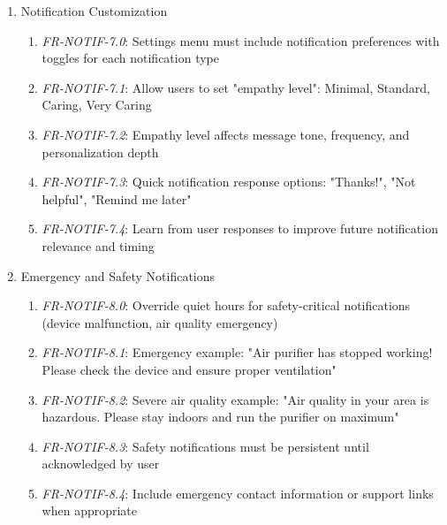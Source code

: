\documentclass[conference]{IEEEtran}
\begin{document}
\begin{enumerate}
\begin{enumerate}
                            \item \textit{FR-NOTIF-6.4}: Smart batching: combine multiple low-priority notifications into daily summary
                        \end{enumerate}
                    \item Notification Customization
                        \begin{enumerate}
                            \item \textit{FR-NOTIF-7.0}: Settings menu must include notification preferences with toggles for each notification type
                            \item \textit{FR-NOTIF-7.1}: Allow users to set "empathy level": Minimal, Standard, Caring, Very Caring
                            \item \textit{FR-NOTIF-7.2}: Empathy level affects message tone, frequency, and personalization depth
                            \item \textit{FR-NOTIF-7.3}: Quick notification response options: "Thanks!", "Not helpful", "Remind me later"
                            \item \textit{FR-NOTIF-7.4}: Learn from user responses to improve future notification relevance and timing
                        \end{enumerate}
                    \item Emergency and Safety Notifications
                        \begin{enumerate}
                            \item \textit{FR-NOTIF-8.0}: Override quiet hours for safety-critical notifications (device malfunction, air quality emergency)
                            \item \textit{FR-NOTIF-8.1}: Emergency example: "Air purifier has stopped working! Please check the device and ensure proper ventilation"
                            \item \textit{FR-NOTIF-8.2}: Severe air quality example: "Air quality in your area is hazardous. Please stay indoors and run the purifier on maximum"
                            \item \textit{FR-NOTIF-8.3}: Safety notifications must be persistent until acknowledged by user
                            \item \textit{FR-NOTIF-8.4}: Include emergency contact information or support links when appropriate
                        \end{enumerate}
                \end{enumerate}
\end{document}
